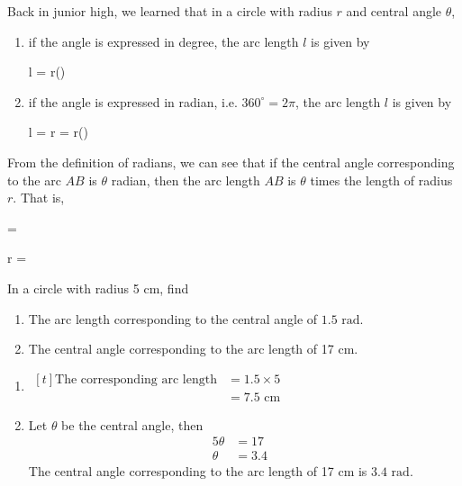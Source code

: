 \documentclass{report}
\begin{document}
Back in junior high, we learned that in a circle with radius $r$ and central angle $\theta$,
\vspace{-1em}
\begin{enumerate}[label=(\arabic*)]
	\item if the angle is expressed in degree, the arc length $l$ is given by
	      \begin{cequation}
	      	l =  \pi r\qquad(\theta {})
	      \end{cequation}
	\item if the angle is expressed in radian, i.e. $360^\circ = 2\pi$, the arc length $l$ is given by
	      \begin{cequation}
	      	l = \dfrac{\theta}{2\pi} \pi r = \theta r\qquad(\theta \text{ is in radian})
	      \end{cequation}
\end{enumerate}

From the definition of radians, we can see that if the central angle corresponding to the arc $AB$ is $\theta$ radian, then the arc length $AB$ is $\theta$ times the length of radius $r$. That is,
\begin{info}
	\begin{cequation}
		\theta = \frac{l}{r}
	\end{cequation}
	\vspace{-1em}
	\begin{cequation}
		r = \frac{l}{\theta}
	\end{cequation}
	\vspace{-1em}
\end{info}

\begin{question}
	In a circle with radius 5 cm, find
	\vspace{-1em}
	\begin{enumerate}[label=(\alph*)]
		\item The arc length corresponding to the central angle of $1.5 \text{ rad}$.
		\item The central angle corresponding to the arc length of 17 cm.
	\end{enumerate}
	\sol{}
	\begin{enumerate}[label=(\alph*)]
		\item $\begin{aligned}[t]
		      \text{The corresponding arc length} &= 1.5 \times 5\\
		      &= 7.5 \text{ cm}
		\end{aligned}$
		\item Let $\theta$ be the central angle, then
		      \begin{align*}
		      	5\theta & = 17 &   \\
		      	\theta &= 3.4
		      \end{align*}
		      The central angle corresponding to the arc length of 17 cm is $3.4 \text{ rad}$.
	\end{enumerate}
\end{question}
\end{document}
